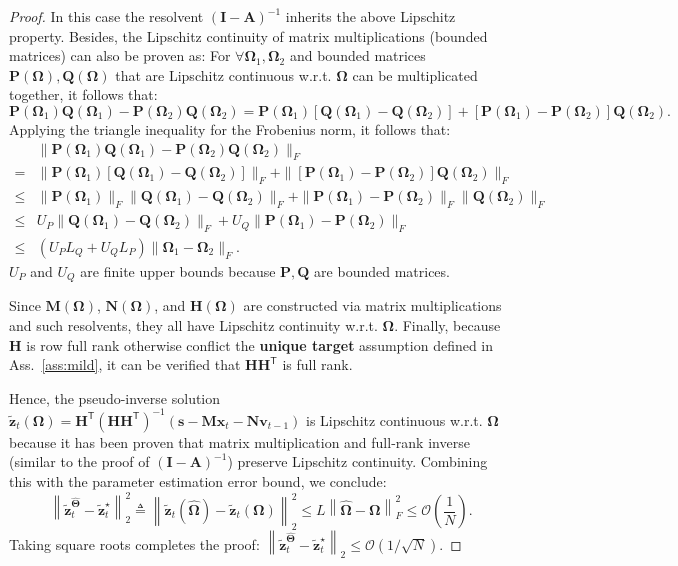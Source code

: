 \documentclass{article}
\theoremstyle{plain}
\theoremstyle{definition}
\theoremstyle{remark}
\def \x {\mathbf{x}}
\def \N {\mathbf{N}}
\def \Q {\mathbf{Q}}
\def \P {\mathbf{P}}
\def \s {\mathbf{s}}
\def \I {\mathbf{I}}
\def \M {\mathbf{M}}
\def \H {\mathbf{H}}
\def \A {\mathbf{A}}
\def \v {\mathbf{v}}
\def \z {\mathbf{z}}
\begin{document}
\begin{proof}
In this case the resolvent $(\I - \A)^{-1}$ inherits the above Lipschitz property. Besides, the Lipschitz continuity of matrix multiplications (bounded matrices) can also be proven as: 
For $\forall \bm{\Omega}_1, \bm{\Omega}_2$ and bounded matrices \(\P(\bm{\Omega}), \Q(\bm{\Omega})\) that are Lipschitz continuous w.r.t. $\bm{\Omega}$ can be multiplicated together, it follows that: 
\[
  \P(\bm{\Omega}_1)\Q(\bm{\Omega}_1) - \P(\bm{\Omega}_2)\Q(\bm{\Omega}_2) 
  = \P(\bm{\Omega}_1)\left[\Q(\bm{\Omega}_1) - \Q(\bm{\Omega}_2)\right] + \left[\P(\bm{\Omega}_1) - \P(\bm{\Omega}_2)\right]\Q(\bm{\Omega}_2).
\]
Applying the triangle inequality for the Frobenius norm, it follows that:
\[
\begin{aligned}
    & \|\P(\bm{\Omega}_1)\Q(\bm{\Omega}_1) - \P(\bm{\Omega}_2)\Q(\bm{\Omega}_2)\|_F  \\
  = & \|\P(\bm{\Omega}_1)\left[\Q(\bm{\Omega}_1) - \Q(\bm{\Omega}_2)\right]\|_F + \|\left[\P(\bm{\Omega}_1) - \P(\bm{\Omega}_2)\right]\Q(\bm{\Omega}_2)\|_F\\
  \leq & \|\P(\bm{\Omega}_1)\|_F\|\Q(\bm{\Omega}_1) - \Q(\bm{\Omega}_2)\|_F + \|\P(\bm{\Omega}_1) - \P(\bm{\Omega}_2)\|_F\|\Q(\bm{\Omega}_2)\|_F\\
  \leq & U_P\|\Q(\bm{\Omega}_1) - \Q(\bm{\Omega}_2)\|_F + U_Q \|\P(\bm{\Omega}_1) - \P(\bm{\Omega}_2)\|_F\\
  \leq & (U_P L_Q + U_Q L_P) \|\bm{\Omega}_1 - \bm{\Omega}_2\|_F.
\end{aligned}
\]
\(U_P\) and \(U_Q\) are finite upper bounds because \(\P, \Q\) are bounded matrices. 




Since $\M(\bm{\Omega})$, $\N(\bm{\Omega})$, and $\H(\bm{\Omega})$ are constructed via matrix multiplications and such resolvents, they all have Lipschitz continuity w.r.t. \(\bm{\Omega}\). Finally, because \(\H\) is row full rank otherwise conflict the \textbf{unique target} assumption defined in Ass.~\ref{ass:mild}, it can be verified that \(\H\H^\mathsf{T}\) is full rank.

  
Hence, the pseudo-inverse solution \(
  \tilde{\z}_t(\bm{\Omega}) = \H^\mathsf{T}(\H\H^\mathsf{T})^{-1} (\s - \M\x_t - \N\v_{t-1})
\) is Lipschitz continuous w.r.t. \(\bm{\Omega}\) because it has been proven that matrix multiplication and full-rank inverse (similar to the proof of \((\I-\A)^{-1}\)) preserve Lipschitz continuity.
  Combining this with the parameter estimation error bound, we conclude:
  \[
   \left\| \tilde{\z}_t^{\hat{\bm{\Theta}}} - \tilde{\z}_t^\star \right\|_2^2 \triangleq  \left\| \tilde{\z}_t(\hat{\bm{\Omega}}) - \tilde{\z}_t(\bm{\Omega}) \right\|_2^2  
  \leq L \left\| \hat{\bm{\Omega}} - \bm{\Omega} \right\|_F^2 
  \leq \mathcal{O}\left( \frac{1}{N} \right).
  \]
  Taking square roots completes the proof:  
  \(\left\| \tilde{\z}_t^{\hat{\bm{\Theta}}} - \tilde{\z}_t^\star \right\|_2 \leq \mathcal{O}(1/\sqrt{N})\).
\end{proof}
\end{document}
